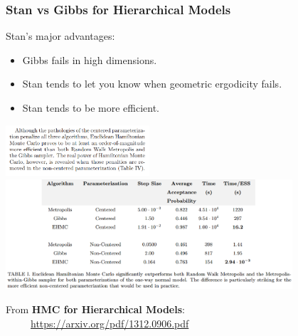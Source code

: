 \documentclass[xcolor=dvipsnames]{beamer}
\begin{document}
\begin{frame}[fragile]
\frametitle{Stan vs Gibbs for Hierarchical Models}
Stan's major advantages:
\begin{itemize}
\item Gibbs fails in high dimensions.
\item Stan tends to let you know when geometric ergodicity fails.
\item Stan tends to be more efficient.
\end{itemize}
\begin{center}
\includegraphics[width = 0.4\textwidth]{center.png}\\
\includegraphics[width = 0.8\textwidth]{hmctable.png}
\end{center}
From \textbf{HMC for Hierarchical Models}: \\
\ \ \ \ \ \url{https://arxiv.org/pdf/1312.0906.pdf}
\end{frame}

\end{document}
